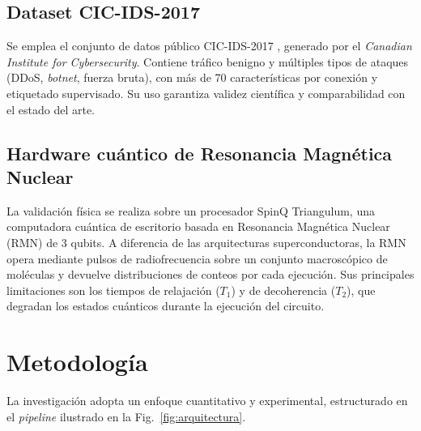 \documentclass[10pt,conference]{IEEEtran}
\begin{document}
\subsection{Dataset CIC-IDS-2017}
Se emplea el conjunto de datos público CIC-IDS-2017
\cite{sharafaldin2018}, generado por el \textit{Canadian Institute for
Cybersecurity}. Contiene tráfico benigno y múltiples tipos de ataques
(DDoS, \textit{botnet}, fuerza bruta), con más de 70 características
por conexión y etiquetado supervisado. Su uso garantiza validez
científica y comparabilidad con el estado del arte.

\subsection{Hardware cuántico de Resonancia Magnética Nuclear}
La validación física se realiza sobre un procesador SpinQ Triangulum,
una computadora cuántica de escritorio basada en Resonancia Magnética
Nuclear (RMN) de 3 qubits. A diferencia de las arquitecturas
superconductoras, la RMN opera mediante pulsos de radiofrecuencia sobre
un conjunto macroscópico de moléculas y devuelve distribuciones de
conteos por cada ejecución. Sus principales limitaciones son los tiempos
de relajación ($T_1$) y de decoherencia ($T_2$), que degradan los
estados cuánticos durante la ejecución del circuito.

\section{Metodología}

La investigación adopta un enfoque cuantitativo y experimental,
estructurado en el \textit{pipeline} ilustrado en la
Fig.~\ref{fig:arquitectura}.
\end{document}
